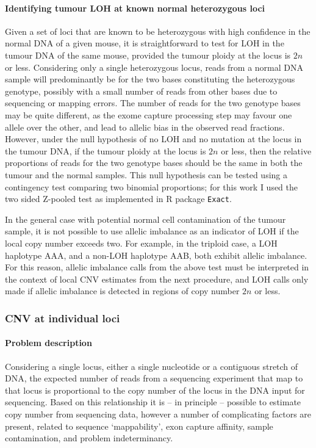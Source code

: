 \documentclass[dissertation.tex]{subfiles}
\begin{document}
\paragraph{Identifying tumour \acrshort{LOH} at known normal heterozygous loci}

Given a set of loci that are known to be heterozygous with high confidence in the normal DNA of a given mouse, it is straightforward to test for \gls{LOH} in the tumour DNA of the same mouse, provided the tumour ploidy at the locus is $2n$ or less.  Considering only a single heterozygous locus, reads from a normal DNA sample will predominantly be for the two bases constituting the heterozygous genotype, possibly with a small number of reads from other bases due to sequencing or mapping errors.  The number of reads for the two genotype bases may be quite different, as the exome capture processing step may favour one allele over the other, and lead to allelic bias in the observed read fractions.  However, under the null hypothesis of no LOH and no mutation at the locus in the tumour DNA, if the tumour ploidy at the locus is $2n$ or less, then the relative proportions of reads for the two genotype bases should be the same in both the tumour and the normal samples.  This null hypothesis can be tested using a contingency test comparing two binomial proportions; for this work I used the two sided Z-pooled test as implemented in R package \lstinline|Exact|.  

In the general case with potential normal cell contamination of the tumour sample, it is not possible to use allelic imbalance as an indicator of \gls{LOH} if the local copy number exceeds two.  For example, in the triploid case, a \gls{LOH} haplotype AAA, and a non-\gls{LOH} haplotype AAB, both exhibit allelic imbalance.  For this reason, allelic imbalance calls from the above test must be interpreted in the context of local \gls{CNV} estimates from the next procedure, and \gls{LOH} calls only made if allelic imbalance is detected in regions of copy number $2n$ or less.


\subsubsection{\Acrlong{CNV} at individual loci}

\paragraph{Problem description}
Considering a single locus, either a single nucleotide or a contiguous stretch of DNA, the expected number of reads from a sequencing experiment that map to that locus is proportional to the copy number of the locus in the DNA input for sequencing.  Based on this relationship it is -- in principle -- possible to estimate copy number from sequencing data, however a number of complicating factors are present, related to sequence `mappability', exon capture affinity, sample contamination, and problem indeterminancy.
\end{document}

